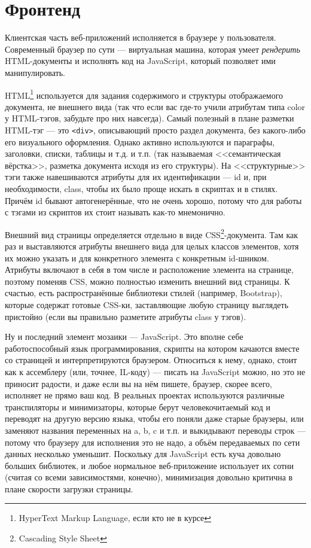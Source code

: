 \documentclass{../../text-style}
\begin{document}
\section{Фронтенд}

Клиентская часть веб-приложений исполняется в браузере у пользователя. Современный браузер по сути --- виртуальная машина, которая умеет \emph{рендерить} HTML-документы и исполнять код на JavaScript, который позволяет ими манипулировать. 

HTML\footnote{HyperText Markup Language, если кто не в курсе} используется для задания содержимого и структуры отображаемого документа, не внешнего вида (так что если вас где-то учили атрибутам типа color у HTML-тэгов, забудьте про них навсегда). Самый полезный в плане разметки HTML-тэг --- это \texttt{<div>}, описывающий просто раздел документа, без какого-либо его визуального оформления. Однако активно используются и параграфы, заголовки, списки, таблицы и т.д. и т.п. (так называемая <<семантическая вёрстка>>, разметка документа исходя из его структуры). На <<структурные>> тэги также навешиваются атрибуты для их идентификации --- id и, при необходимости, class, чтобы их было проще искать в скриптах и в стилях. Причём id бывают автогенерённые, что не очень хорошо, потому что для работы с тэгами из скриптов их стоит называть как-то мнемонично.

Внешний вид страницы определяется отдельно в виде CSS\footnote{Cascading Style Sheet}-документа. Там как раз и выставляются атрибуты внешнего вида для целых классов элементов, хотя их можно указать и для конкретного элемента с конкретным id-шником. Атрибуты включают в себя в том числе и расположение элемента на странице, поэтому поменяв CSS, можно полностью изменить внешний вид страницы. К счастью, есть распространённые библиотеки стилей (например, Bootstrap), которые содержат готовые CSS-ки, заставляющие любую страницу выглядеть пристойно (если вы правильно разметите атрибуты class у тэгов).

Ну и последний элемент мозаики --- JavaScript. Это вполне себе работоспособный язык программирования, скрипты на котором качаются вместе со страницей и интерпретируются браузером. Относиться к нему, однако, стоит как к ассемблеру (или, точнее, IL-коду) --- писать на JavaScript можно, но это не приносит радости, и даже если вы на нём пишете, браузер, скорее всего, исполняет не прямо ваш код. В реальных проектах используются различные транспиляторы и минимизаторы, которые берут человекочитаемый код и переводят на другую версию языка, чтобы его поняли даже старые браузеры, или заменяют названия переменных на a, b, c и т.п. и выкидывают переводы строк --- потому что браузеру для исполнения это не надо, а объём передаваемых по сети данных несколько уменьшит. Поскольку для JavaScript есть куча довольно больших библиотек, и любое нормальное веб-приложение использует их сотни (считая со всеми зависимостями, конечно), минимизация довольно критична в плане скорости загрузки страницы.
\end{document}
